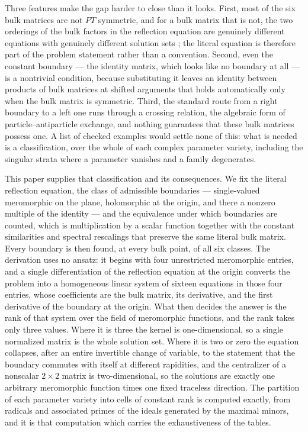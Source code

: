 \documentclass[11pt,reqno]{amsart}
\theoremstyle{plain}
\theoremstyle{definition}
\theoremstyle{remark}
\numberwithin{equation}{section}
\begin{document}
Three features make the gap harder to close than it looks. First, most of the six
bulk matrices are not $PT$ symmetric, and for a bulk matrix that is not, the two
orderings of the bulk factors in the reflection equation are genuinely different
equations with genuinely different solution sets \cite{mezincescu1991}; the
literal equation is therefore part of the problem statement rather than a
convention. Second, even the constant boundary --- the identity matrix, which
looks like no boundary at all --- is a nontrivial condition, because substituting
it leaves an identity between products of bulk matrices at shifted arguments that
holds automatically only when the bulk matrix is symmetric. Third, the standard
route from a right boundary to a left one runs through a crossing relation, the
algebraic form of particle--antiparticle exchange, and nothing guarantees that
these bulk matrices possess one. A list of checked examples would settle none of
this: what is needed is a classification, over the whole of each complex
parameter variety, including the singular strata where a parameter vanishes and a
family degenerates.

This paper supplies that classification and its consequences. We fix the literal
reflection equation, the class of admissible boundaries --- single-valued
meromorphic on the plane, holomorphic at the origin, and there a nonzero multiple
of the identity --- and the equivalence under which boundaries are counted, which
is multiplication by a scalar function together with the constant similarities
and spectral rescalings that preserve the same literal bulk matrix. Every
boundary is then found, at every bulk point, of all six classes. The derivation
uses no ansatz: it begins with four unrestricted meromorphic entries, and a
single differentiation of the reflection equation at the origin converts the
problem into a homogeneous linear system of sixteen equations in those four
entries, whose coefficients are the bulk matrix, its derivative, and the first
derivative of the boundary at the origin. What then decides the answer is the
rank of that system over the field of meromorphic functions, and the rank takes
only three values. Where it is three the kernel is one-dimensional, so a single
normalized matrix is the whole solution set. Where it is two or zero the equation
collapses, after an entire invertible change of variable, to the statement that
the boundary commutes with itself at different rapidities, and the centralizer of
a nonscalar $2\times2$ matrix is two-dimensional, so the solutions are exactly
one arbitrary meromorphic function times one fixed traceless direction. The
partition of each parameter variety into cells of constant rank is computed
exactly, from radicals and associated primes of the ideals generated by the
maximal minors, and it is that computation which carries the exhaustiveness of
the tables.
\end{document}
